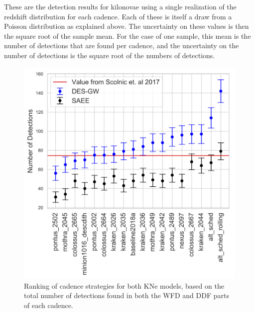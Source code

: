 \documentclass[a4paper,10pt]{article}
\begin{document}
These are the detection results for kilonovae using a single realization of the redshift distribution for each cadence. Each of these is itself a draw from a Poisson distribution as explained above. The uncertainty on these values is then the square root of the sample mean. For the case of one sample, this mean is the number of detections that are found per cadence, and the uncertainty on the number of detections is the square root of the numbers of detections.
\begin{figure}[h!]
  \centering
  \includegraphics[scale=0.69]{../figures/total_detection_counts_by_cadence}
  \caption{Ranking of cadence strategies for both KNe models, based on the total number of detections found in both the WFD and DDF parts of each cadence.}
  \label{fig:cadence_ranking}
\end{figure}



\end{document}

